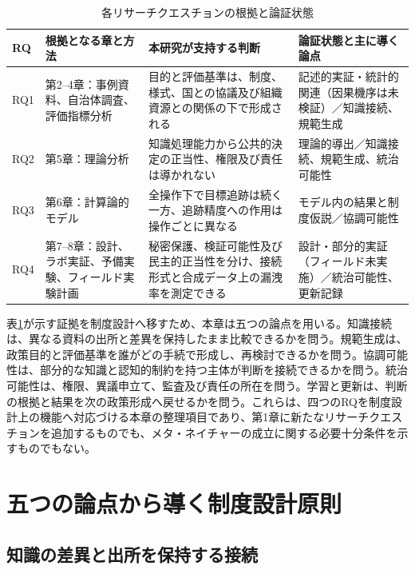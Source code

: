 \begin{table}[H]
  \centering
  \caption{各リサーチクエスチョンの根拠と論証状態}
  \label{tab:ch9_rq_evidence}
  \small
  \begin{tabularx}{\textwidth}{p{}p{}X p{}}
    \toprule
    RQ & 根拠となる章と方法 & 本研究が支持する判断 & 論証状態と主に導く論点 \\
    \midrule
    RQ1 & 第2--4章：事例資料、自治体調査、評価指標分析 & 目的と評価基準は、制度、様式、国との協議及び組織資源との関係の下で形成される & 記述的実証・統計的関連（因果機序は未検証）／知識接続、規範生成 \\
    RQ2 & 第5章：理論分析 & 知識処理能力から公共的決定の正当性、権限及び責任は導かれない & 理論的導出／知識接続、規範生成、統治可能性 \\
    RQ3 & 第6章：計算論的モデル & 全操作下で目標追跡は続く一方、追跡精度への作用は操作ごとに異なる & モデル内の結果と制度仮説／協調可能性 \\
    RQ4 & 第7--8章：設計、ラボ実証、予備実験、フィールド実験計画 & 秘密保護、検証可能性及び民主的正当性を分け、接続形式と合成データ上の漏洩率を測定できる & 設計・部分的実証（フィールド未実施）／統治可能性、更新記録 \\
    \bottomrule
  \end{tabularx}
\end{table}

表\ref{tab:ch9_rq_evidence}が示す証拠を制度設計へ移すため、本章は五つの論点を用いる。知識接続は、異なる資料の出所と差異を保持したまま比較できるかを問う。規範生成は、政策目的と評価基準を誰がどの手続で形成し、再検討できるかを問う。協調可能性は、部分的な知識と認知的制約を持つ主体が判断を接続できるかを問う。統治可能性は、権限、異議申立て、監査及び責任の所在を問う。学習と更新は、判断の根拠と結果を次の政策形成へ戻せるかを問う。これらは、四つのRQを制度設計上の機能へ対応づける本章の整理項目であり、第1章に新たなリサーチクエスチョンを追加するものでも、メタ・ネイチャーの成立に関する必要十分条件を示すものでもない。

\section{五つの論点から導く制度設計原則}
\label{sec:ch9_design_principles}

\subsection{知識の差異と出所を保持する接続}

